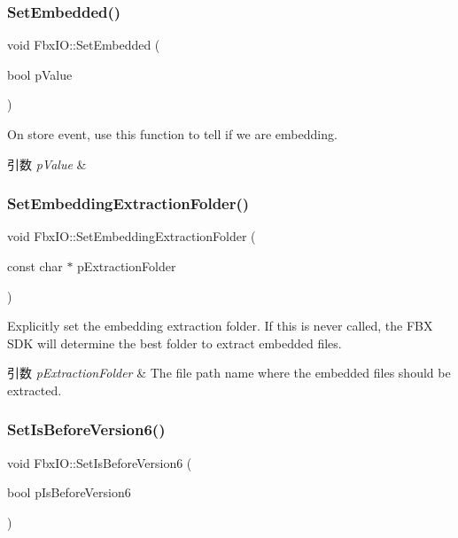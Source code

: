 \subsubsection{\texorpdfstring{Set\+Embedded()}{SetEmbedded()}}
{\footnotesize\ttfamily void Fbx\+I\+O\+::\+Set\+Embedded (\begin{DoxyParamCaption}\item[{bool}]{p\+Value }\end{DoxyParamCaption})}

On store event, use this function to tell if we are embedding. 
\begin{DoxyParams}{引数}
{\em p\+Value} & \\
\hline
\end{DoxyParams}
\mbox{\label{class_fbx_i_o_a742d963ed9bc37d36527d3c27dbe86fd}} 
\subsubsection{\texorpdfstring{Set\+Embedding\+Extraction\+Folder()}{SetEmbeddingExtractionFolder()}}
{\footnotesize\ttfamily void Fbx\+I\+O\+::\+Set\+Embedding\+Extraction\+Folder (\begin{DoxyParamCaption}\item[{const char $\ast$}]{p\+Extraction\+Folder }\end{DoxyParamCaption})}

Explicitly set the embedding extraction folder. If this is never called, the F\+BX S\+DK will determine the best folder to extract embedded files. 
\begin{DoxyParams}{引数}
{\em p\+Extraction\+Folder} & The file path name where the embedded files should be extracted. \\
\hline
\end{DoxyParams}
\mbox{\label{class_fbx_i_o_a6846d5fc3fa3f6317a2765c9bf9a13b4}} 
\subsubsection{\texorpdfstring{Set\+Is\+Before\+Version6()}{SetIsBeforeVersion6()}}
{\footnotesize\ttfamily void Fbx\+I\+O\+::\+Set\+Is\+Before\+Version6 (\begin{DoxyParamCaption}\item[{bool}]{p\+Is\+Before\+Version6 }\end{DoxyParamCaption})}

